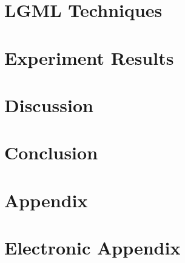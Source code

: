 \documentclass[12pt]{article}
\begin{document}
\section{LGML Techniques}
\label{techniques}


% 

\section{Experiment Results}
\label{experiment}


\section{Discussion}
\label{discussion}


\section{Conclusion}
\label{concl}


\newpage

    


\setcounter{page}{5}

\appendix

\section{Appendix}
\label{app}
% 
\newpage

\section{Electronic Appendix}
\label{el_app}
\end{document}
